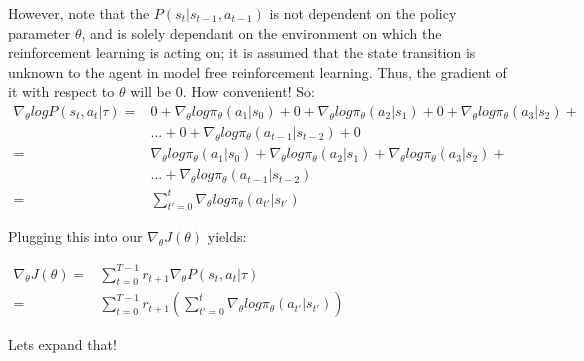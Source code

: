 \documentclass[letterpaper,11pt]{article}
\begin{document}
However, note that the $P(s_{t} | s_{t-1}, a_{t-1})$ is not dependent on the policy parameter $\theta$, and is solely dependant on the environment on which the reinforcement learning is acting on; it is assumed that the state transition is unknown to the agent in model free reinforcement learning. Thus, the gradient of it with respect to $\theta$ will be 0. How convenient! So: 
$$
\begin{aligned}
    \nabla_{\theta} log P(s_{t}, a_{t} | \tau) ={}& 0 + \nabla_{\theta} log \pi_{\theta}(a_{1} | s_{0}) + 0 + \nabla_{\theta} log \pi_{\theta}(a_{2} | s_{1}) + 0 + \nabla_{\theta} log \pi_{\theta}(a_{3} | s_{2}) + \\ & {} ... {} + {} 0 + \nabla_{\theta} log \pi_{\theta}(a_{t-1} | s_{t-2}) + 0 \\ ={}& \nabla_{\theta} log \pi_{\theta}(a_{1} | s_{0}) + \nabla_{\theta} log \pi_{\theta}(a_{2} | s_{1}) + \nabla_{\theta} log \pi_{\theta}(a_{3} | s_{2}) + \\
& ... + \nabla_{\theta} log \pi_{\theta}(a_{t-1} | s_{t-2}) \\ ={}& \sum\limits_{t'=0}^{t} \nabla_{\theta} log \pi_{\theta}(a_{t'} | s_{t'})                                                
\end{aligned}
$$

Plugging this into our $\nabla_{\theta} J(\theta)$ yields:

$\begin{aligned}
    \nabla_{\theta} J(\theta) ={}& \sum_{t=0}^{T-1} r_{t+1} \nabla_{\theta} P(s_{t}, a_{t} | \tau) \\
                              ={}& \sum_{t=0}^{T-1} r_{t+1} (\sum_{t'=0}^{t} \nabla_{\theta} log \pi_{\theta}(a_{t'} | s_{t'}))
\end{aligned}$

\vspace{1.0cm}
Lets expand that! 
\vspace{1.0cm}
\end{document}
